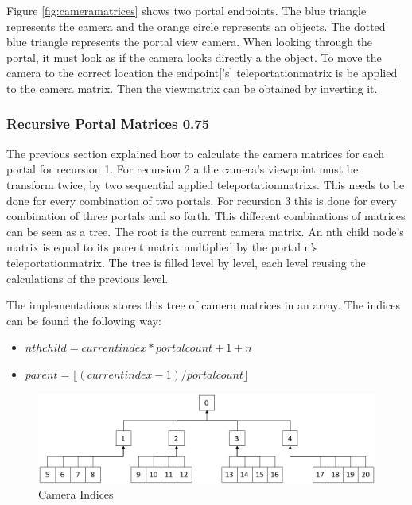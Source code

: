 Figure \ref{fig:cameramatrices} shows two portal endpoints. The blue triangle represents the camera and the orange circle represents an objects. The dotted blue triangle represents the portal view camera.
When looking through the portal, it must look as if the camera looks directly a the object. To move the camera to the correct location the \gls{endpoint}['s] \gls{teleportationmatrix} is be applied to the camera matrix. Then the  \gls{viewmatrix} can be obtained by inverting it.


\subsubsection{Recursive Portal Matrices 0.75}
\label{section:recursivecameramatrices}
The previous section explained how to calculate the camera matrices for each portal for recursion 1. For recursion 2 a the camera's viewpoint must be transform twice, by two sequential applied \glspl{teleportationmatrix}. This needs to be done for every combination of two portals. For recursion 3 this is done for every combination of three portals and so forth. This different combinations of matrices can be seen as a tree. The root is the current camera matrix. An nth child node's matrix is equal to its parent matrix multiplied by the portal n's \gls{teleportationmatrix}. The tree is filled level by level, each level reusing the calculations of the previous level.




The implementations stores this tree of camera matrices in an array. The indices can be found the following way:

\begin{itemize}
	\item $ nth child = current index * portalcount + 1 + n$
	\item $ parent = \lfloor(current index-1)/portal count\rfloor $
\end{itemize}




\begin{figure}[h]
	\includegraphics[width=\linewidth]{images/cameraindices.png}
	\caption{Camera Indices}
	\label{fig:cameraindices}
\end{figure}

